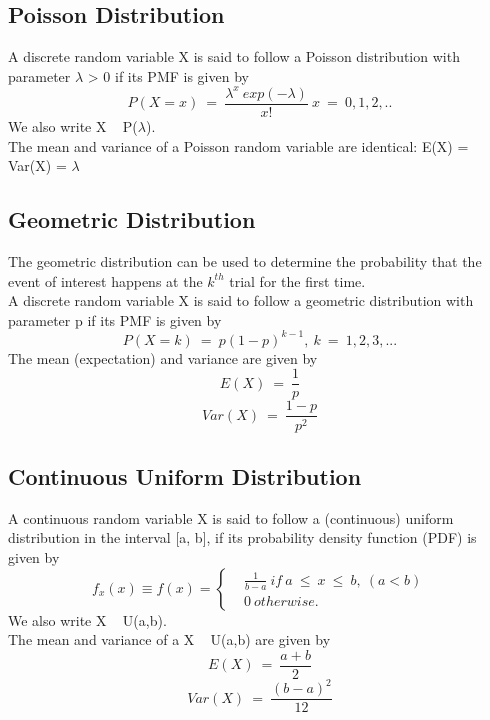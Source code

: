 \subsection*{Poisson Distribution}
A discrete random variable X is said to follow a Poisson distribution
with parameter $\lambda$ > 0 if its PMF is given by
\[ P(X = x)\ =\ \frac{\lambda^x\ exp(-\lambda)}{x!}\   x\ =\ 0,1,2,..\]
We also write X ~ P($\lambda$).\\
The mean and variance of a Poisson random variable are identical:
E(X) = Var(X) = $\lambda$

\subsection*{Geometric Distribution}
The geometric distribution can be used to determine the probability
that the event of interest happens at the $k^{th}$ trial for the first time.\\
A discrete random variable X is said to follow a geometric distribution
with parameter p if its PMF is given by
\[ P(X = k)\ =\ p(1-p)^{k-1},\ k\ =\ 1,2,3,...\]
The mean (expectation) and variance are given by
\[ E(X)\ =\ \frac{1}{p}\]
\[ Var(X)\ =\ \frac{1-p}{p^2} \] 

\subsection*{Continuous Uniform Distribution}
A continuous random variable X is said to follow a (continuous)
uniform distribution in the interval [a, b], if its probability density
function (PDF) is given by
\begin{equation}
f_x(x) \equiv f(x) =
\begin{cases}
& \frac{1}{b-a}\ if\ a\ \leq\ x\ \leq\ b,\ (a<b)\\
& 0\ otherwise.
\end{cases}
\end{equation}
We also write X ~ U(a,b).\\
The mean and variance of a X ~ U(a,b) are given by
\[ E(X)\ =\ \frac{a+b}{2}\]
\[ Var(X)\ =\ \frac{(b-a)^2}{12} \] 

